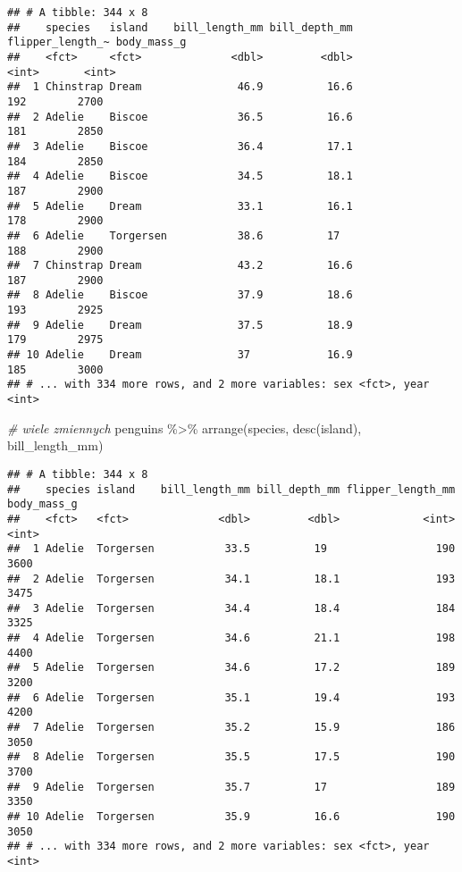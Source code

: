 \documentclass[
]{book}
\newenvironment{Shaded}{\begin{snugshade}}{\end{snugshade}}
\newcommand{\CommentTok}[1]{\textcolor[rgb]{0.56,0.35,0.01}{\textit{#1}}}
\newcommand{\FunctionTok}[1]{\textcolor[rgb]{0.00,0.00,0.00}{#1}}
\newcommand{\NormalTok}[1]{#1}
\newcommand{\SpecialCharTok}[1]{\textcolor[rgb]{0.00,0.00,0.00}{#1}}
\begin{document}
\begin{verbatim}
## # A tibble: 344 x 8
##    species   island    bill_length_mm bill_depth_mm flipper_length_~ body_mass_g
##    <fct>     <fct>              <dbl>         <dbl>            <int>       <int>
##  1 Chinstrap Dream               46.9          16.6              192        2700
##  2 Adelie    Biscoe              36.5          16.6              181        2850
##  3 Adelie    Biscoe              36.4          17.1              184        2850
##  4 Adelie    Biscoe              34.5          18.1              187        2900
##  5 Adelie    Dream               33.1          16.1              178        2900
##  6 Adelie    Torgersen           38.6          17                188        2900
##  7 Chinstrap Dream               43.2          16.6              187        2900
##  8 Adelie    Biscoe              37.9          18.6              193        2925
##  9 Adelie    Dream               37.5          18.9              179        2975
## 10 Adelie    Dream               37            16.9              185        3000
## # ... with 334 more rows, and 2 more variables: sex <fct>, year <int>
\end{verbatim}

\begin{Shaded}
\begin{Highlighting}[]
\CommentTok{\# wiele zmiennych}
\NormalTok{penguins }\SpecialCharTok{\%\textgreater{}\%} \FunctionTok{arrange}\NormalTok{(species, }\FunctionTok{desc}\NormalTok{(island), bill\_length\_mm)}
\end{Highlighting}
\end{Shaded}

\begin{verbatim}
## # A tibble: 344 x 8
##    species island    bill_length_mm bill_depth_mm flipper_length_mm body_mass_g
##    <fct>   <fct>              <dbl>         <dbl>             <int>       <int>
##  1 Adelie  Torgersen           33.5          19                 190        3600
##  2 Adelie  Torgersen           34.1          18.1               193        3475
##  3 Adelie  Torgersen           34.4          18.4               184        3325
##  4 Adelie  Torgersen           34.6          21.1               198        4400
##  5 Adelie  Torgersen           34.6          17.2               189        3200
##  6 Adelie  Torgersen           35.1          19.4               193        4200
##  7 Adelie  Torgersen           35.2          15.9               186        3050
##  8 Adelie  Torgersen           35.5          17.5               190        3700
##  9 Adelie  Torgersen           35.7          17                 189        3350
## 10 Adelie  Torgersen           35.9          16.6               190        3050
## # ... with 334 more rows, and 2 more variables: sex <fct>, year <int>
\end{verbatim}
\end{document}
